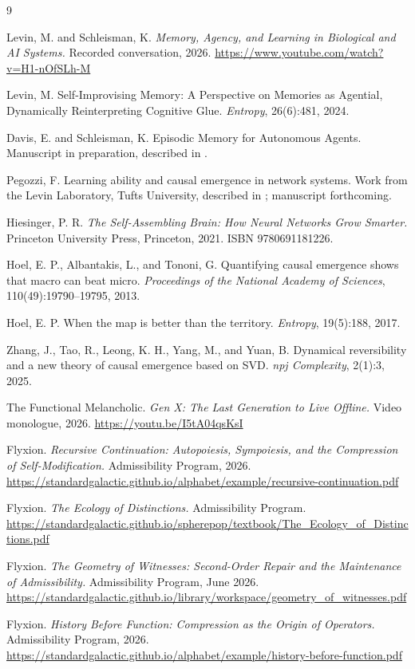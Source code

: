 \documentclass[11pt]{article}
\begin{document}
\newpage
\begin{thebibliography}{9}

Levin, M. and Schleisman, K.
\textit{Memory, Agency, and Learning in Biological and AI Systems.}
Recorded conversation, 2026.
\url{https://www.youtube.com/watch?v=H1-nOfSLh-M}

Levin, M.
Self-Improvising Memory: A Perspective on Memories as Agential, Dynamically Reinterpreting Cognitive Glue.
\textit{Entropy}, 26(6):481, 2024.

Davis, E. and Schleisman, K.
Episodic Memory for Autonomous Agents.
Manuscript in preparation, described in \cite{levinschleisman2026}.

Pegozzi, F.
Learning ability and causal emergence in network systems.
Work from the Levin Laboratory, Tufts University, described in \cite{levinschleisman2026}; manuscript forthcoming.

Hiesinger, P. R.
\textit{The Self-Assembling Brain: How Neural Networks Grow Smarter.}
Princeton University Press, Princeton, 2021.
ISBN 9780691181226.

Hoel, E. P., Albantakis, L., and Tononi, G.
Quantifying causal emergence shows that macro can beat micro.
\textit{Proceedings of the National Academy of Sciences}, 110(49):19790--19795, 2013.

Hoel, E. P.
When the map is better than the territory.
\textit{Entropy}, 19(5):188, 2017.

Zhang, J., Tao, R., Leong, K. H., Yang, M., and Yuan, B.
Dynamical reversibility and a new theory of causal emergence based on SVD.
\textit{npj Complexity}, 2(1):3, 2025.

The Functional Melancholic.
\textit{Gen X: The Last Generation to Live Offline.}
Video monologue, 2026. \url{https://youtu.be/I5tA04qsKsI}

Flyxion.
\textit{Recursive Continuation: Autopoiesis, Sympoiesis, and the Compression of Self-Modification.}
Admissibility Program, 2026. \url{https://standardgalactic.github.io/alphabet/example/recursive-continuation.pdf}

Flyxion.
\textit{The Ecology of Distinctions.}
Admissibility Program. \url{https://standardgalactic.github.io/spherepop/textbook/The_Ecology_of_Distinctions.pdf}

Flyxion.
\textit{The Geometry of Witnesses: Second-Order Repair and the Maintenance of Admissibility.}
Admissibility Program, June 2026. \url{https://standardgalactic.github.io/library/workspace/geometry_of_witnesses.pdf}

Flyxion.
\textit{History Before Function: Compression as the Origin of Operators.}
Admissibility Program, 2026. \url{https://standardgalactic.github.io/alphabet/example/history-before-function.pdf}

\end{thebibliography}
\end{document}
